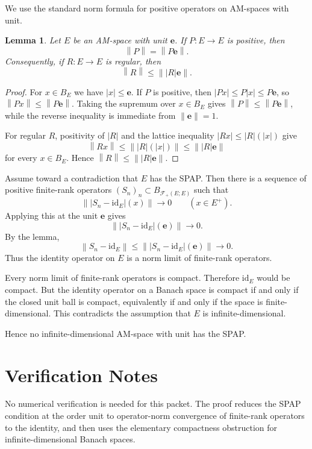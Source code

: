 \documentclass[11pt]{article}
\newtheorem{lemma}{Lemma}
\newcommand{\norm}[1]{\left\lVert #1 \right\rVert}
\newcommand{\id}{\mathrm{id}}
\newcommand{\e}{\mathbf{e}}
\newcommand{\calF}{\mathcal{F}}
\begin{document}
We use the standard norm formula for positive operators on AM-spaces
with unit.

\begin{lemma}
Let $E$ be an AM-space with unit $\e$. If $P:E\to E$ is positive, then
\[
  \norm{P}=\norm{P\e}.
\]
Consequently, if $R:E\to E$ is regular, then
\[
  \norm{R}\leq \norm{|R|\e}.
\]
\end{lemma}

\begin{proof}
For $x\in B_E$ we have $|x|\leq \e$. If $P$ is positive, then
$|Px|\leq P|x|\leq P\e$, so $\norm{Px}\leq\norm{P\e}$. Taking the
supremum over $x\in B_E$ gives $\norm{P}\leq\norm{P\e}$, while the
reverse inequality is immediate from $\norm{\e}=1$.

For regular $R$, positivity of $|R|$ and the lattice inequality
$|Rx|\leq |R|(|x|)$ give
\[
  \norm{Rx}\leq \norm{|R|(|x|)}\leq \norm{|R|\e}
\]
for every $x\in B_E$. Hence $\norm{R}\leq\norm{|R|\e}$.
\end{proof}

Assume toward a contradiction that $E$ has the SPAP. Then there is a
sequence of positive finite-rank operators
$(S_n)_n\subset B_{\calF_+(E;E)}$ such that
\[
  \norm{|S_n-\id_E|(x)}\longrightarrow 0
  \qquad (x\in E^+).
\]
Applying this at the unit $\e$ gives
\[
  \norm{|S_n-\id_E|(\e)}\longrightarrow 0.
\]
By the lemma,
\[
  \norm{S_n-\id_E}\leq \norm{|S_n-\id_E|(\e)}
  \longrightarrow 0.
\]
Thus the identity operator on $E$ is a norm limit of finite-rank
operators.

Every norm limit of finite-rank operators is compact. Therefore
$\id_E$ would be compact. But the identity operator on a Banach space is
compact if and only if the closed unit ball is compact, equivalently if
and only if the space is finite-dimensional. This contradicts the
assumption that $E$ is infinite-dimensional.

Hence no infinite-dimensional AM-space with unit has the SPAP.

\section*{Verification Notes}

No numerical verification is needed for this packet. The proof reduces
the SPAP condition at the order unit to operator-norm convergence of
finite-rank operators to the identity, and then uses the elementary
compactness obstruction for infinite-dimensional Banach spaces.
\end{document}
